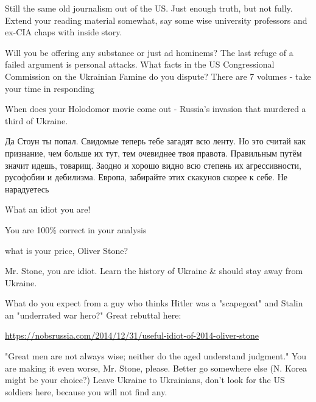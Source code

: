\begin{itemize}
\begin{itemize} %

Still the same old journalism out of the US. Just enough truth, but not fully.
Extend your reading material somewhat, say some wise university professors and
ex-CIA chaps with inside story.



Will you be offering any substance or just ad hominems? The last refuge of a
failed argument is personal attacks. What facts in the US Congressional
Commission on the Ukrainian Famine do you dispute? There are 7 volumes - take
your time in responding

\end{itemize} %


When does your Holodomor movie come out - Russia's invasion that murdered a
third of Ukraine.


Да Стоун ты попал. Свидомые теперь тебе загадят всю ленту. Но это считай как
признание, чем больше их тут, тем очевиднее твоя правота. Правильным путём
значит идешь, товарищ. Заодно и хорошо видно всю степень их агрессивности,
русофобии и дебилизма. Европа, забирайте этих скакунов скорее к себе. Не
нарадуетесь

\begin{itemize} %
What an idiot you are!
\end{itemize} %

You are 100\% correct in your analysis

what is your price, Oliver Stone?

Mr. Stone, you are idiot. Learn the history of Ukraine \& should stay away from Ukraine.


What do you expect from a guy who thinks Hitler was a "scapegoat" and Stalin an
"underrated war hero?" Great rebuttal here:

\url{https://nobsrussia.com/2014/12/31/useful-idiot-of-2014-oliver-stone}


"Great men are not always wise; neither do the aged understand judgment." You
are making it even worse, Mr. Stone, please. Better go somewhere else (N. Korea
might be your choice?) Leave Ukraine to Ukrainians, don't look for the US
soldiers here, because you will not find any.



\end{itemize}
